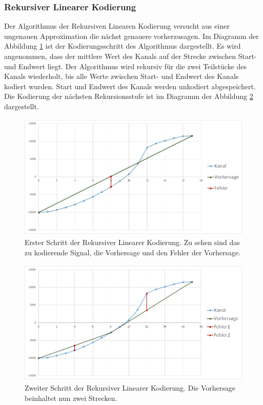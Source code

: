 \subsubsection{Rekursiver Linearer Kodierung}
Der Algorithmus der Rekursiven Linearen Kodierung versucht aus einer ungenauen Approximation die nächst genauere vorherzusagen. Im Diagramm der Abbildung \ref{konzept:loesung2:algorithm:step1} ist der Kodierungsschritt des Algorithmus dargestellt. Es wird angenommen, dass der mittlere Wert des Kanals auf der Strecke zwischen Start- und Endwert liegt. Der Algorithmus wird rekursiv für die zwei Teilstücke des Kanals wiederholt, bis alle Werte zwischen Start- und Endwert des Kanals kodiert wurden. Start und Endwert des Kanals werden unkodiert abgespeichert. Die Kodierung der nächsten Rekursionsstufe ist im Diagramm der Abbildung \ref{konzept:loesung2:algorithm:step2} dargestellt.
\begin{figure}[!htbp]
	\center
	\includegraphics[width=1\textwidth,height=6cm,keepaspectratio]{./pictures/konzept/solution2/algorithm_step1.png}
	\caption{Erster Schritt der Rekursiver Linearer Kodierung. Zu sehen sind das zu kodierende Signal, die Vorhersage und den Fehler der Vorhersage.}
	\label{konzept:loesung2:algorithm:step1}
\end{figure} 
\begin{figure}[!htbp]
	\center
	\includegraphics[width=1\textwidth,height=6cm,keepaspectratio]{./pictures/konzept/solution2/algorithm_step2.png}
	\caption{Zweiter Schritt der Rekursiver Linearer Kodierung. Die Vorhersage beinhaltet nun zwei Strecken.}
	\label{konzept:loesung2:algorithm:step2}
\end{figure} 

